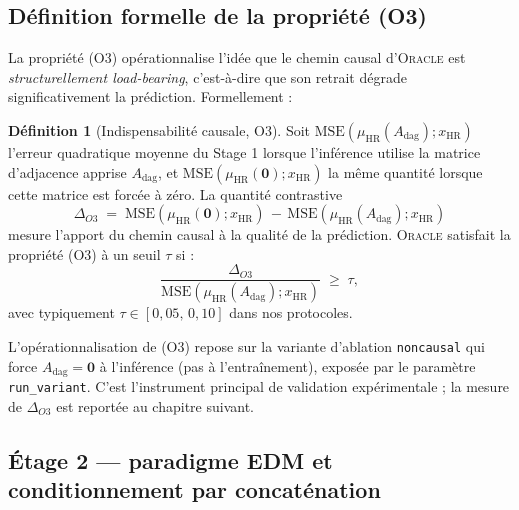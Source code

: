\documentclass[14pt,a4paper,openany]{extreport}
\theoremstyle{definition}
\newtheorem{definition}{Définition}[chapter]
\newcommand{\Oracle}{\textsc{Oracle}}
\newcommand{\HR}{\ensuremath{\text{HR}}}
\newcommand{\xHR}{\ensuremath{x_{\HR}}}
\newcommand{\muHR}{\ensuremath{\mu_{\HR}}}
\newcommand{\Adag}{\ensuremath{A_{\mathrm{dag}}}}
\begin{document}
\subsection{Définition formelle de la propriété (O3)}
\label{ssec:oracle-o3-def}

La propriété (O3) opérationnalise l'idée que le chemin causal d'\Oracle{} est \emph{structurellement load-bearing}, c'est-à-dire que son retrait dégrade significativement la prédiction. Formellement :

\begin{definition}[Indispensabilité causale, O3]\label{def:o3}
Soit $\mathrm{MSE}\!\left( \muHR(\Adag); \xHR \right)$ l'erreur quadratique moyenne du Stage 1 lorsque l'inférence utilise la matrice d'adjacence apprise $\Adag$, et $\mathrm{MSE}\!\left( \muHR(\mathbf{0}); \xHR \right)$ la même quantité lorsque cette matrice est forcée à zéro. La quantité contrastive
\begin{equation}
  \Delta_{O3} \;=\; \mathrm{MSE}\!\left( \muHR(\mathbf{0}); \xHR \right) \,-\, \mathrm{MSE}\!\left( \muHR(\Adag); \xHR \right)
  \label{eq:delta-o3}
\end{equation}
mesure l'apport du chemin causal à la qualité de la prédiction. \Oracle{} satisfait la propriété (O3) à un seuil $\tau$ si :
\begin{equation}
  \frac{\Delta_{O3}}{\mathrm{MSE}\!\left( \muHR(\Adag); \xHR \right)} \;\geq\; \tau,
  \label{eq:o3-criterion}
\end{equation}
avec typiquement $\tau \in [0{,}05,\, 0{,}10]$ dans nos protocoles.
\end{definition}

L'opérationnalisation de (O3) repose sur la variante d'ablation \texttt{noncausal} qui force $\Adag = \mathbf{0}$ à l'inférence (pas à l'entraînement), exposée par le paramètre \texttt{run\_variant}. C'est l'instrument principal de validation expérimentale ; la mesure de $\Delta_{O3}$ est reportée au chapitre suivant.

\subsection{Étage 2 --- paradigme EDM et conditionnement par concaténation}
\label{sec:oracle-edm}
\end{document}
